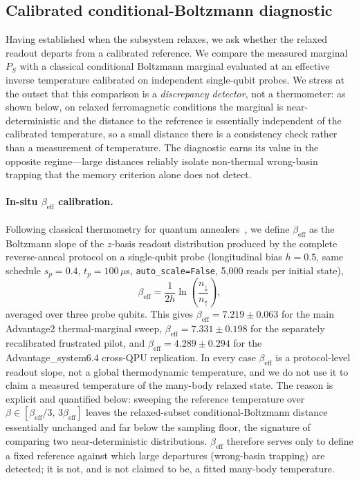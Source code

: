 \subsection{Calibrated conditional-Boltzmann diagnostic}

Having established when the subsystem relaxes, we ask whether the relaxed readout departs from a calibrated reference.
We compare the measured marginal $P_S$ with a classical conditional Boltzmann marginal evaluated at an effective inverse temperature calibrated on independent single-qubit probes.
We stress at the outset that this comparison is a \emph{discrepancy detector}, not a thermometer: as shown below, on relaxed ferromagnetic conditions the marginal is near-deterministic and the distance to the reference is essentially independent of the calibrated temperature, so a small distance there is a consistency check rather than a measurement of temperature.
The diagnostic earns its value in the opposite regime---large distances reliably isolate non-thermal wrong-basin trapping that the memory criterion alone does not detect.

\paragraph{In-situ $\beta_\mathrm{eff}$ calibration.}
Following classical thermometry for quantum annealers~\cite{grattan2025thermometry}, we define $\beta_\mathrm{eff}$ as the Boltzmann slope of the $z$-basis readout distribution produced by the complete reverse-anneal protocol on a single-qubit probe (longitudinal bias $h=0.5$, same schedule $s_p=0.4$, $t_p=100\,\mu$s, \texttt{auto\_scale=False}, 5{,}000 reads per initial state),
\begin{equation}
    \beta_\mathrm{eff}
    = \frac{1}{2h}
      \ln\!\left(\frac{n_\downarrow}{n_\uparrow}\right),
    \label{eq:beta_eff}
\end{equation}
averaged over three probe qubits.
This gives $\beta_\mathrm{eff}=7.219\pm 0.063$ for the main Advantage2 thermal-marginal sweep, $\beta_\mathrm{eff}=7.331\pm 0.198$ for the separately recalibrated frustrated pilot, and $\beta_\mathrm{eff}=4.289\pm 0.294$ for the Advantage\_system6.4 cross-QPU replication.
In every case $\beta_\mathrm{eff}$ is a protocol-level readout slope, not a global thermodynamic temperature, and we do not use it to claim a measured temperature of the many-body relaxed state.
The reason is explicit and quantified below: sweeping the reference temperature over $\beta\in[\beta_\mathrm{eff}/3,\,3\beta_\mathrm{eff}]$ leaves the relaxed-subset conditional-Boltzmann distance essentially unchanged and far below the sampling floor, the signature of comparing two near-deterministic distributions.
$\beta_\mathrm{eff}$ therefore serves only to define a fixed reference against which large departures (wrong-basin trapping) are detected; it is not, and is not claimed to be, a fitted many-body temperature.

